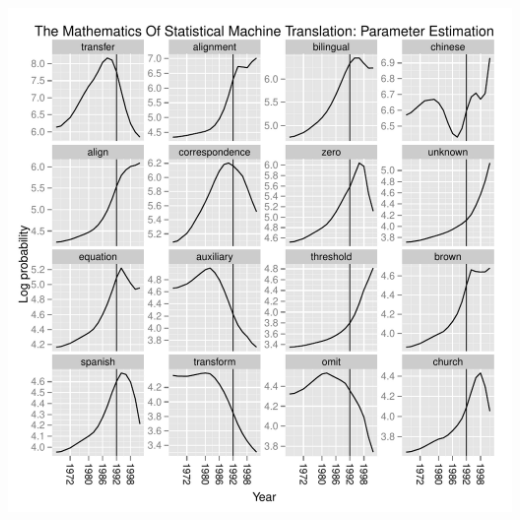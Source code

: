 \documentclass{beamer}
\begin{document}
{\begin{columns}
\begin{column}[left]{0.7\linewidth}
      \includegraphics[width=1.0\textwidth]{figs/acl_brown.pdf}
    \end{column}
  \end{columns}

}


\end{document}
